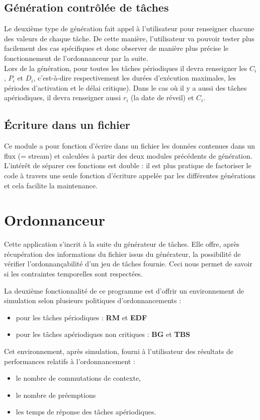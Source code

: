 			\subsection{Génération contrôlée de tâches}
				Le deuxième type de génération fait appel à l'utilisateur pour renseigner chacune des valeurs de chaque tâche. De cette manière, l'utilisateur va pouvoir tester plus facilement des cas spécifiques et donc observer de manière plus précise le fonctionnement de l'ordonnanceur par la suite. \\
				Lors de la génération, pour toutes les tâches périodiques il devra renseigner les $C_i$, $P_i$ et $D_i$, c'est-à-dire respectivement les durées d'exécution maximales, les périodes d'activation et le délai critique). Dans le cas où il y a aussi des tâches apériodiques, il devra renseigner aussi $r_i$ (la date de réveil) et $C_i$.

			\subsection{Écriture dans un fichier}
				Ce module a pour fonction d’écrire dans un fichier les données contenues dans un flux (= stream)  et calculées à partir des deux modules précédents de génération. L’intérêt de séparer ces fonctions est double : il est plus pratique de factoriser le code à travers une seule fonction d’écriture appelée par les différentes générations et cela facilite la maintenance.
	
	\section{Ordonnanceur}
		Cette application s'incrit à la suite du générateur de tâches. Elle offre, après récupération des informations du fichier issus du générateur, la possibilité de vérifier l'ordonnançabilité d'un jeu de tâches fournie. Ceci nous permet de savoir si les contraintes temporelles sont respectées. 

		La deuxième fonctionnalité de ce programme est d'offrir un environnement de simulation selon plusieurs politiques d'ordonnancements :
		\begin{itemize}
			\item pour les tâches périodiques : \textbf{RM} et \textbf{EDF}
			\item pour les tâches apériodiques non critiques :  \textbf{BG} et \textbf{TBS}
		\end{itemize}
		Cet environnement, après simulation, fourni à l'utilisateur des résultats de performances relatifs à l'ordonnancement : 
		\begin{itemize}
			\item le nombre de commutations de contexte,
			\item le nombre de préemptions
			\item les temps de réponse des tâches apériodiques.
		\end{itemize}
	
